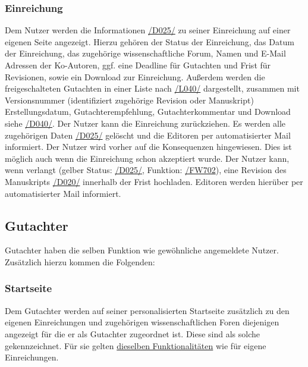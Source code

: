 \subsubsection{Einreichung}\label{nut:ein}
\begin{description}
     Dem Nutzer werden die Informationen \hyperref[d025]{/D025/} zu seiner Einreichung auf einer eigenen Seite
    angezeigt. Hierzu gehören der Status der Einreichung, das Datum der Einreichung, das zugehörige
    wissenschaftliche Forum, Namen und E-Mail Adressen der Ko-Autoren, ggf. eine Deadline für Gutachten und Frist für Revisionen,
    sowie ein Download zur Einreichung.
     Außerdem werden die freigeschalteten Gutachten in einer
    Liste nach \hyperref[leist:40]{/L040/} dargestellt, zusammen mit Versionsnummer (identifiziert zugehörige Revision oder Manuskript)
    Erstellungsdatum, Gutachterempfehlung, Gutachterkommentar und Download siehe \hyperref[d040]{/D040/}.
     Der Nutzer kann die Einreichung zurückziehen. Es werden alle zugehörigen Daten
    \hyperref[d025]{/D025/} gelöscht und die Editoren per automatisierter Mail informiert.
    Der Nutzer wird vorher auf die Konsequenzen hingewiesen. Dies ist möglich auch wenn die Einreichung schon akzeptiert wurde.
     Der Nutzer kann, wenn verlangt (gelber Status: \hyperref[d025]{/D025/}, Funktion: \hyperref[funkt:702]{/FW702}),
    eine Revision des Manuskripts \hyperref[d020]{/D020/} innerhalb der Frist hochladen.
    Editoren werden hierüber per automatisierter Mail informiert.
\end{description}

\subsection{Gutachter}\label{funkt:Gutachter}
Gutachter haben die selben Funktion wie gewöhnliche angemeldete Nutzer. Zusätzlich hierzu kommen die Folgenden:

\subsubsection{Startseite}
\begin{description}
     Dem Gutachter werden auf seiner personalisierten Startseite zusätzlich zu den eigenen
    Einreichungen und zugehörigen wissenschaftlichen Foren diejenigen angezeigt für die er als Gutachter
    zugeordnet ist. Diese sind als solche gekennzeichnet.
    Für sie gelten \hyperref[nut:start]{dieselben Funktionalitäten} wie für eigene Einreichungen.
\end{description}

